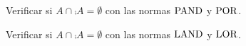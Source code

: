 Verificar si \(A ∩ \comp{A} = ∅\)
con las normas \(\operatorname{PAND}\) y \(\operatorname{POR}\).

Verificar si \(A ∩ \comp{A} = ∅\)
con las normas \(\operatorname{LAND}\) y \(\operatorname{LOR}\).

